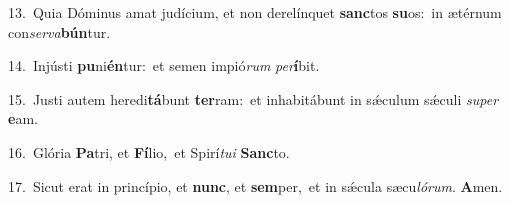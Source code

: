 {\numbfont\textcolor{\numbcolor}{13.}}~Quia Dóminus amat judícium, et non derelínquet \textbf{sanc}\-tos \textbf{su}\-os:~\star in ætérnum con\-\textit{ser}\-\textit{va}\textbf{bún}tur.\par
{\numbfont\textcolor{\numbcolor}{14.}}~Injústi \textbf{pu}\-ni\-\textbf{én}\-tur:~\star et semen impió\textit{rum} \textit{per}\-\textbf{í}bit.\par
{\numbfont\textcolor{\numbcolor}{15.}}~Justi autem heredi\-\textbf{tá}\-bunt \textbf{ter}\-ram:~\star et inhabitábunt in sǽculum sǽculi \textit{su}\-\textit{per} \textbf{e}\-am.\par
{\numbfont\textcolor{\numbcolor}{16.}}~Glória \textbf{Pa}\-tri, et \textbf{Fí}\-lio,~\star et Spirí\-\textit{tu}\-\textit{i} \textbf{Sanc}\-to.\par
{\numbfont\textcolor{\numbcolor}{17.}}~Sicut erat in princípio, et \textbf{nunc}\-, et \textbf{sem}\-per,~\star et in sǽcula sæcu\-\textit{ló}\-\textit{rum}. \textbf{A}\-men.\par
